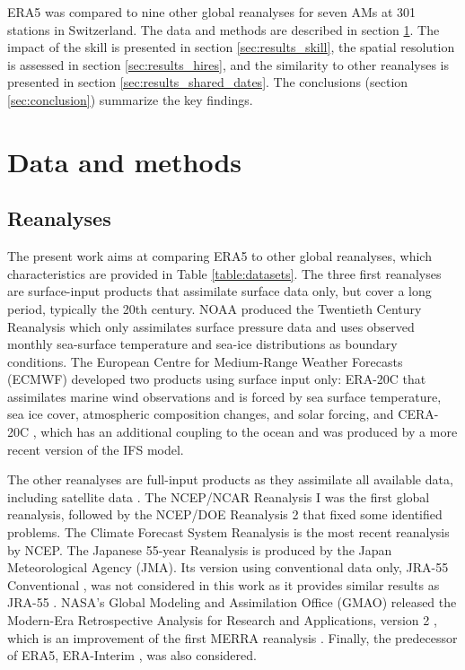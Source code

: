 \documentclass[alpha-refs]{wiley-article}
\begin{document}
ERA5 was compared to nine other global reanalyses for seven AMs at 301 stations in Switzerland. The data and methods are described in section \ref{sec:data_methods}. The impact of the skill is presented in section \ref{sec:results_skill}, the spatial resolution is assessed in section \ref{sec:results_hires}, and the similarity to other reanalyses is presented in section \ref{sec:results_shared_dates}. The conclusions (section \ref{sec:conclusion}) summarize the key findings.


\section{Data and methods}
\label{sec:data_methods}

\subsection{Reanalyses}
\label{sec:reanalyses}

The present work aims at comparing ERA5 \citep{Hersbach2019} to other global reanalyses, which characteristics are provided in Table \ref{table:datasets}. The three first reanalyses are surface-input \citep{Fujiwara2017} products that assimilate surface data only, but cover a long period, typically the 20th century. NOAA produced the Twentieth Century Reanalysis \citep[version 2c, 20CR-2c --][]{Compo2011} which only assimilates surface pressure data and uses observed monthly sea-surface temperature and sea-ice distributions as boundary conditions. The European Centre for Medium-Range Weather Forecasts (ECMWF) developed two products using surface input only: ERA-20C \citep{Poli2016} that assimilates marine wind observations and is forced by sea surface temperature, sea ice cover, atmospheric composition changes, and solar forcing, and CERA-20C \citep{Laloyaux2018a}, which has an additional coupling to the ocean and was produced by a more recent version of the IFS model.

The other reanalyses are full-input products as they assimilate all available data, including satellite data \citep{Fujiwara2017}. The NCEP/NCAR Reanalysis I \citep[NR-1 --][]{Kalnay1996, Kistler2001} was the first global reanalysis, followed by the NCEP/DOE Reanalysis 2 \citep[NR-2 --][]{Kanamitsu2002} that fixed some identified problems. The Climate Forecast System Reanalysis \citep[CFSR --][]{Saha2010a} is the most recent reanalysis by NCEP. The Japanese 55-year Reanalysis \citep[JRA-55 --][]{Kobayashi2015, Harada2016} is produced by the Japan Meteorological Agency (JMA). Its version using conventional data only, JRA-55 Conventional \citep[JRA-55C --][]{Kobayashi2014}, was not considered in this work as it provides similar results as JRA-55 \citep{Horton2018b}. NASA's Global Modeling and Assimilation Office (GMAO) released the Modern-Era Retrospective Analysis for Research and Applications, version 2 \citep[MERRA-2 -- ][]{Gelaro2017}, which is an improvement of the first MERRA reanalysis \citep{Rienecker2011}. Finally, the predecessor of ERA5, ERA-Interim \citep[ERA-INT --][]{Dee2011a}, was also considered.
\end{document}
